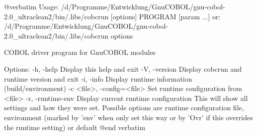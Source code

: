@verbatim
Usage: /d/Programme/Entwicklung/GnuCOBOL/gnu-cobol-2.0_ultraclean2/bin/.libs/cobcrun [options] PROGRAM [param ...]
  or:  /d/Programme/Entwicklung/GnuCOBOL/gnu-cobol-2.0_ultraclean2/bin/.libs/cobcrun options

COBOL driver program for GnuCOBOL modules

Options:
  -h, -help                   Display this help and exit
  -V, -version                Display cobcrun and runtime version and exit
  -i, -info                   Display runtime information (build/environment)
  -c <file>, -config=<file>   Set runtime configuration from <file>
  -r, -runtime-env            Display current runtime configuration
                              This will show all settings and how they were set.
                              Possible options are runtime configuration file,
                              environment (marked by 'env' when only set this way or
                              by 'Ovr' if this overrides the runtime setting) or default
@end verbatim

